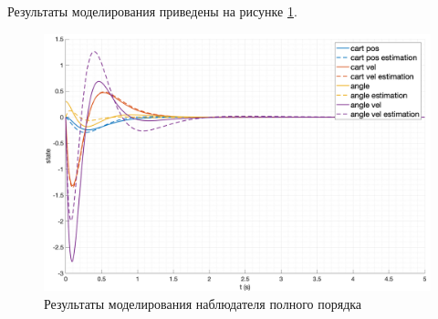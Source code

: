 Результаты моделирования приведены на рисунке \ref{fig:observer_x_1}.
\begin{figure}[ht!]
    \centering
    \includegraphics[width=\textwidth]{media/plots/modal_observer/observer_cmp_1.png}
    \caption{Результаты моделирования наблюдателя полного порядка}
    \label{fig:observer_x_1}
\end{figure}
